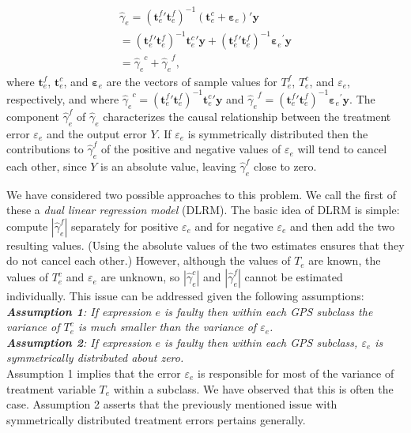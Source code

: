 \begin{equation}\label{decomp}
\begin{array}{l}
{{\hat \gamma}_e} = {({{\pmb t}_e^f}'{\pmb t}_e^f)^{ - 1}}({\pmb t}_e^c + {{\pmb \varepsilon} _e})'{\pmb y}\\
 = {({{\pmb t}_e^f}'{\pmb t}_e^f)^{ - 1}}{{\pmb t}_e^c}'{\pmb y} + {({{\pmb t}_e^f}'{\pmb t}_e^f)^{ - 1}}{{\pmb \varepsilon} _e}^\prime {\pmb y}\\
 = {{\hat \gamma}_e}^c + {{\hat \gamma}_e}^f,
\end{array}
\end{equation}
where $\pmb{t}_e^f$, $\pmb{t}_e^c$, and ${\pmb \varepsilon}_e$ are the vectors of sample values for $T_e^f$, $T_e^c$, and $\varepsilon_e$, respectively, and where ${{\hat \gamma}_e}^c  = {({{\pmb t}_e^f}'{\pmb t}_e^f)^{ - 1}}{{\pmb t}_e^c}'{\pmb y} $ and ${{\hat \gamma}_e}^f = {({{\pmb t}_e^f}'{\pmb t}_e^f)^{ - 1}}{{\pmb \varepsilon} _e}^\prime {\pmb y}$. The component $\hat \gamma _e^f$ of ${\hat \gamma _e}$ characterizes the causal relationship between the treatment error $\varepsilon_e$ and the output error $Y$. If $\varepsilon_e$ is symmetrically distributed then the contributions to $\hat \gamma _e^f$ of the positive and negative values of $\varepsilon_e$ will tend to cancel each other, since $Y$ is an absolute value, leaving $\hat \gamma _e^f$ close to zero.

We have considered two possible approaches to this problem.  We call the first of these a {\it dual linear regression model} (DLRM).  The basic idea of DLRM is simple: compute
$|\hat \gamma _e^f|$ separately for positive $\varepsilon_e$ and for negative $\varepsilon_e$ and then add the two resulting values.  (Using the absolute values of the two estimates ensures that they do not cancel each other.)  However, although the values of $T_e$ are known, the values of $ T_e^c$ and $\varepsilon_e$ are unknown, so $|\hat \gamma _e^c|$ and $|\hat \gamma _e^f|$ cannot be estimated individually.  This issue can be addressed given the following assumptions:\\
\newline
\textit{ \textbf{ Assumption 1}: If expression $e$ is faulty then within each GPS subclass the variance of $ T_e^c$ is much smaller than the variance of $\varepsilon_e$.}\\
\textit{ \textbf{ Assumption 2}: If expression $e$ is faulty then within each GPS subclass, $\varepsilon_e$ is symmetrically distributed about zero.}\\
\newline
Assumption 1 implies that the error  $\varepsilon_e$ is responsible for most of the variance of treatment variable $T_e$ within a subclass.  We have observed that this is often the case. Assumption 2 asserts that the previously mentioned issue with symmetrically distributed treatment errors pertains generally.

